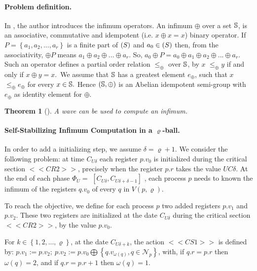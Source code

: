 \documentclass[11pt]{article}
\newtheorem{theorem}{Theorem}[section]
\begin{document}
\paragraph{Problem definition.}
In \cite{T88,Tel94}, the author introduces the infimum
operators. An infimum $\oplus $ over a set $\Bbb{S}$, is an associative,
commutative and idempotent (i.e. $x\oplus x=x$) binary operator. 
If $P=\left\{ a_{1},a_{2},...,a_{r}\right\} $ is a finite part of $\Bbb(S)$ and $a_0 \in \Bbb(S)$  then, from the associativity,
$\oplus P$ means $a_{1}\oplus a_{2}\oplus ...\oplus a_{r}$.  So, $a_0 \oplus P = a_0 \oplus a_{1}\oplus a_{2}\oplus ...\oplus a_{r}$. 
Such an operator defines a partial order relation $\leq _{\oplus }$ over $\Bbb{S}$,
by $x$ $\leq _{\oplus }y$ if and only if $x\oplus y=x$.\ We assume that $\Bbb{S}$
has a greatest element $e_{\oplus }$, such that $x$ $\leq _{\oplus }e_{\oplus }$
for every $x\in \Bbb{S } .$ Hence $\left( 
\Bbb{S } ,\oplus \right) $ is an Abelian
idempotent semi-group with $e_{\oplus }$ as identity element for $\oplus $. 



\begin{theorem}[\cite{T88,Tel94}]
\label{th:infimum}
A wave can be used to compute an infimum.
\end{theorem}






\paragraph{Self-Stabilizing Infimum Computation in a $\varrho$-ball.}

In order to  add a initializing step, we assume $\delta = \varrho +1$. 
We consider the following problem: at time $C_{U\delta }$ each register $p.v_0$ is initialized during the critical
section $<<CR2>>$, precisely when the register 
$p.r$ takes the value $UC\delta  $. At the end of each phase $\Phi_U=
$ $\left[ C_{U\delta },C_{U\delta  +\delta -1}\right] $ , each process $p$
needs to known the infimum of the registers $q.v_0$ of every
$q$ in $V\left( p,\varrho \right)$.

To reach the objective, we define for each process $p$ two added registers 
$p.v_{1}$ and $p.v_{2}$. These two registers are initialized  at the date $C_{U\delta }$ during the critical section $<<CR2>>$, by the value $p.v_{0}$.

For $k \in \left\{ 1,2,...,\varrho \right\} $, at the date $C_{U\delta + k }$, 
the action $<<CS1>>$ is defined by:\newline
\noindent
$
p.v_{1}:=p.v_{2};\ p.v_{2}:=p.v_{0}\bigoplus \left\{ q.v_{\omega  \left(
q\right) },q\in \mathcal{N}_{p}\right\} 
$,
with,  if $q.r=p.r$ then  $\omega  \left( q\right) =2$, and if $q.r=p.r+1$  
then $\omega  \left( q\right) =1$.
\end{document}
